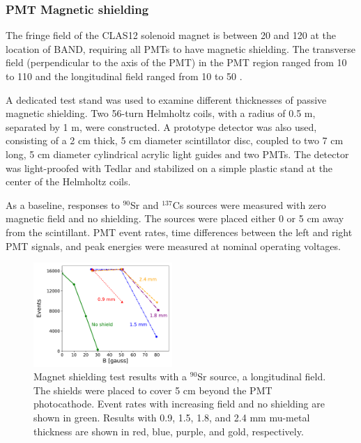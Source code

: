 \documentclass[3p,final,twocolumn]{elsarticle}
\begin{document}
\subsubsection{PMT Magnetic shielding}


The fringe field of the CLAS12 solenoid magnet
\cite{Fair:2020yfx} is between 20 and 120 \si{\gauss} at the location of
BAND, requiring all PMTs to have magnetic shielding. The transverse
field (perpendicular to the axis of the PMT) in the PMT region ranged from 10 to
  110 \si{\gauss} and the longitudinal field ranged from 10 to 50 \si{\gauss}.

  A dedicated test stand was used to examine different thicknesses of
  passive magnetic shielding. Two 56-turn Helmholtz
  coils, with a radius of 0.5 \si{\meter}, separated by 1 \si{\meter}, were 
  constructed. A prototype detector was also used, consisting of a 2 \si{\centi\meter} thick, 5
  \si{\centi\meter} diameter scintillator disc, coupled to two
  7 \si{\centi\meter} long, 5 \si{\centi\meter} diameter cylindrical
  acrylic light guides and two PMTs. The detector was
  light-proofed with Tedlar\textregistered{} and stabilized on a simple plastic stand
  at the center of the Helmholtz coils.

  As a baseline, responses to $^{90}$Sr and $^{137}$Cs sources were measured with zero magnetic field and no shielding. The sources were placed either 0 or 5 \si{\centi\meter} away from the scintillant. PMT event rates, time differences between the left and right PMT signals, and peak energies were measured at nominal operating voltages.
\begin{figure}[tb]
	\centering
			\includegraphics[width=0.47\textwidth]{shielding_results.pdf}
	\caption{Magnet shielding test results with a $^{90}$Sr source, a longitudinal field. The shields were placed to cover 5 \si{\centi\meter} beyond the PMT photocathode. Event rates with increasing field and no shielding are shown in green. Results with 0.9, 1.5, 1.8, and 2.4 \si{\milli\meter} mu-metal thickness are shown in red, blue, purple, and gold, respectively.}
	\label{fig:shielding_results}
\end{figure}  
  
\end{document}
